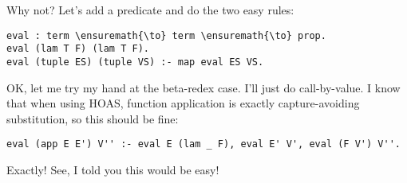 \heroADVISOR{} Why not? Let's add a predicate and do the two easy rules:

\begin{verbatim}
eval : term \ensuremath{\to} term \ensuremath{\to} prop.
eval (lam T F) (lam T F).
eval (tuple ES) (tuple VS) :- map eval ES VS.
\end{verbatim}

\heroSTUDENT{} OK, let me try my hand at the beta-redex case. I'll just do
call-by-value. I know that when using HOAS, function application is
exactly capture-avoiding substitution, so this should be fine:

\begin{verbatim}
eval (app E E') V'' :- eval E (lam _ F), eval E' V', eval (F V') V''.
\end{verbatim}

\heroADVISOR{} Exactly! See, I told you this would be easy!
